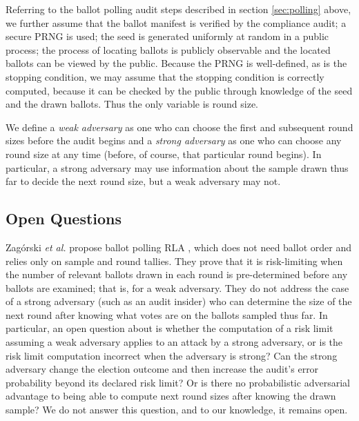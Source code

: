 Referring to the ballot polling audit steps described in section \ref{sec:polling} above, we further assume that the ballot manifest is verified by the compliance audit; a secure PRNG is used; the seed is generated uniformly at random in a public process; the process of locating ballots is publicly observable and the located ballots can be viewed by the public. Because the PRNG is well-defined, as is the stopping condition, we may assume that the stopping condition is correctly computed, because it can be checked by the public through knowledge of the seed and the drawn ballots. Thus the only variable is round size. 

We define a {\em weak adversary} as one who can choose the first and subsequent round sizes before the audit begins and a {\em strong adversary} as one who can choose any round size at any time (before, of course, that particular round begins). In particular, a strong adversary may use information about the sample drawn thus far to decide the next round size, but a weak adversary may not. 

\subsection{Open Questions}
Zag\'{o}rski {\em et al.} propose ballot polling RLA \Minerva \cite{usenix_minerva}, which does not need ballot order and relies only on sample and round tallies. They prove that it is risk-limiting when the number of relevant ballots drawn in each round is pre-determined before any ballots are examined; that is, for a weak adversary. They do not address the case of a strong adversary (such as an audit insider) who can determine the size of the next round after knowing what votes are on the ballots sampled thus far. In particular, an open question about \Minerva is whether the computation of a risk limit assuming a weak adversary applies to an attack by a strong adversary, or is the risk limit computation incorrect when the adversary is strong? Can the strong adversary change the election outcome and then increase the audit's error probability beyond its declared risk limit? Or is there no probabilistic adversarial advantage to being able to compute next round sizes after knowing the drawn sample? We do not answer this question, and to our knowledge, it remains open. 

